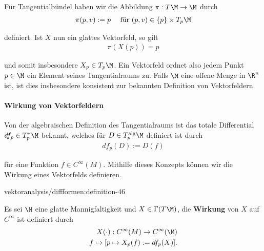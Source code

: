 \documentclass[letterpaper,10pt,english]{jupyterBook}
\begin{document}
\par
Für Tangentialbündel haben wir die Abbildung \(\pi:T\M\to\M\) durch
\begin{align*}
\pi(p,v):= p\quad\text{ für } (p,v)\in\{p\}\times T_p\M
\end{align*}
\par
definiert. Ist \(X\) nun ein glattes Vektorfeld, so gilt
\begin{align*}
\pi(X(p)) = p
\end{align*}
\par
und somit insbesondere \(X_p\in T_p\M\). Ein Vektorfeld ordnet also jedem Punkt \(p\in\M\) ein Element seines Tangentialraums zu. Falls \(\M\) eine offene Menge in \(\R^n\) ist, ist dies insbesondere konsistent zur bekannten Definition von Vektorfeldern.


\paragraph{Wirkung von Vektorfeldern}
\label{\detokenize{vektoranalysis/diffformen:wirkung-von-vektorfeldern}}
\par
Von der algebraischen Definition des Tangentialraums ist das totale Differential \(df_p\in T^\ast_p\M\) bekannt, welches für \(D\in T^{\text{alg}}_p\M\) definiert ist durch
\begin{align*}
df_p(D):= D(f)
\end{align*}
\par
für eine Funktion \(f\in C^\infty(M)\). Mithilfe dieses Konzepts können wir die Wirkung eines Vektorfelds definieren.
\begin{definition}{}{vektoranalysis/diffformen:definition-46}



\par
Es sei \(\M\) eine glatte Mannigfaltigkeit und \(X\in\Gamma(T\M)\), die \textbf{Wirkung} von \(X\) auf \(C^\infty\) ist definiert durch
\begin{align*}
X(\cdot):C^\infty(M)\to C^\infty(\M)\\
f\mapsto [p\mapsto X_p(f) := df_p(X)].
\end{align*}\end{definition}
\end{document}
